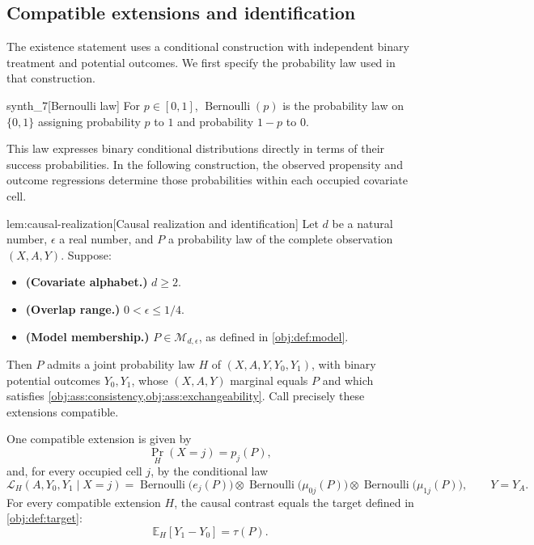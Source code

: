 \documentclass[11pt]{article}
\begin{document}
\subsection{Compatible extensions and identification}

The existence statement uses a conditional construction with independent binary treatment and potential outcomes. We first specify the probability law used in that construction.

\begin{definitionv}{synth_7}[Bernoulli law]
For \(p\in[0,1]\), \(\operatorname{Bernoulli}(p)\) is the probability law on \(\{0,1\}\) assigning probability \(p\) to \(1\) and probability \(1-p\) to \(0\).
\end{definitionv}

This law expresses binary conditional distributions directly in terms of their success probabilities. In the following construction, the observed propensity and outcome regressions determine those probabilities within each occupied covariate cell.

\begin{lemmav}{lem:causal-realization}[Causal realization and identification]
Let \(d\) be a natural number, \(\epsilon\) a real number, and \(P\) a probability law of the complete observation \((X,A,Y)\). Suppose:
\begin{itemize}
\item \textbf{(Covariate alphabet.)} \(d\ge 2\).
\item \textbf{(Overlap range.)} \(0<\epsilon\le 1/4\).
\item \textbf{(Model membership.)} \(P\in\mathcal M_{d,\epsilon}\), as defined in \cref{obj:def:model}.
\end{itemize}
Then \(P\) admits a joint probability law \(H\) of \((X,A,Y,Y_0,Y_1)\), with binary potential outcomes \(Y_0,Y_1\), whose \((X,A,Y)\) marginal equals \(P\) and which satisfies \cref{obj:ass:consistency,obj:ass:exchangeability}. Call precisely these extensions compatible.

One compatible extension is given by
\[
\Pr_H(X=j)=p_j(P),
\]
and, for every occupied cell \(j\), by the conditional law
\[
\mathcal L_H(A,Y_0,Y_1\mid X=j)
=
\operatorname{Bernoulli}\!\bigl(e_j(P)\bigr)
\otimes
\operatorname{Bernoulli}\!\bigl(\mu_{0j}(P)\bigr)
\otimes
\operatorname{Bernoulli}\!\bigl(\mu_{1j}(P)\bigr),
\qquad Y=Y_A.
\]
For every compatible extension \(H\), the causal contrast equals the target defined in \cref{obj:def:target}:
\[
\mathbb E_H[Y_1-Y_0]=\tau(P).
\]
\end{lemmav}
\end{document}
